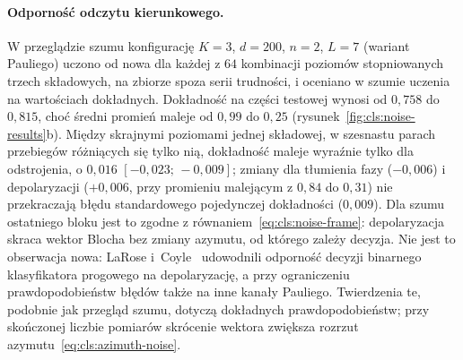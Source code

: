 \paragraph{Odporność odczytu kierunkowego.}
W przeglądzie szumu konfigurację $K=3$, $d=200$, $n=2$, $L=7$ (wariant Pauliego) uczono od nowa dla każdej z $64$ kombinacji poziomów stopniowanych trzech składowych, na zbiorze spoza serii trudności, i oceniano w szumie uczenia na wartościach dokładnych.
Dokładność na części testowej wynosi od $0{,}758$ do $0{,}815$, choć średni promień maleje od $0{,}99$ do $0{,}25$ (rysunek~\ref{fig:cls:noise-results}b).
Między skrajnymi poziomami jednej składowej, w szesnastu parach przebiegów różniących się tylko nią, dokładność maleje wyraźnie tylko dla odstrojenia, o $0{,}016$ $[-0{,}023;\,-0{,}009]$; zmiany dla tłumienia fazy ($-0{,}006$) i depolaryzacji ($+0{,}006$, przy promieniu malejącym z $0{,}84$ do $0{,}31$) nie przekraczają błędu standardowego pojedynczej dokładności ($0{,}009$).
Dla szumu ostatniego bloku jest to zgodne z równaniem~\eqref{eq:cls:noise-frame}: depolaryzacja skraca wektor Blocha bez zmiany azymutu, od którego zależy decyzja.
Nie jest to obserwacja nowa: LaRose i~Coyle~\cite{larose_robust_2020} udowodnili odporność decyzji binarnego klasyfikatora progowego na depolaryzację, a przy ograniczeniu prawdopodobieństw błędów także na inne kanały Pauliego.
Twierdzenia te, podobnie jak przegląd szumu, dotyczą dokładnych prawdopodobieństw; przy skończonej liczbie pomiarów skrócenie wektora zwiększa rozrzut azymutu~\eqref{eq:cls:azimuth-noise}.
